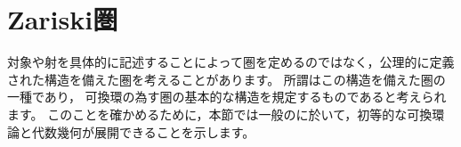 
\section{Zariski圏}
対象や射を具体的に記述することによって圏を定めるのではなく，公理的に定義された構造を備えた圏を考えることがあります。
所謂\WordZariskiCategory はこの構造を備えた圏の一種であり，
可換環の為す圏の基本的な構造を規定するものであると考えられます。
このことを確かめるために，本節では一般の\WordZariskiCategory に於いて，初等的な可換環論と代数幾何が展開できることを示します。

